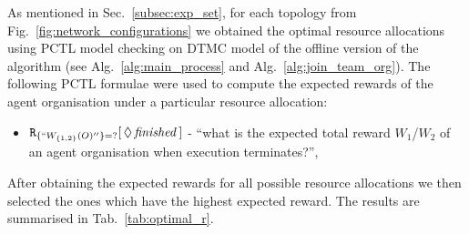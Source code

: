 \documentclass{llncs}
\begin{document}
\begin{table}
\centering
{}

\caption{Model comparison for different number of agents in a fully connected agent organisation and different models for offline version of the Alg.~\ref{alg:main_process}.}
\label{tab:model_sizes}
\end{table}

As mentioned in Sec.~\ref{subsec:exp_set}, for each topology from Fig.~\ref{fig:network_configurations} we obtained the optimal resource allocations using PCTL model checking on DTMC model of the offline version of the algorithm (see Alg.~\ref{alg:main_process} and Alg.~\ref{alg:join_team_org}). The following PCTL formulae were used to compute the expected rewards of the agent organisation under a particular resource allocation:
\begin{itemize}
 \item ${\tt R}_{\{``W_{\{1,2\}}(O)''\}=?}[\,\Diamond\,\mathit{finished}\,]$ -
``what is the expected total reward  $W_1$/$W_2$ of an agent organisation when execution terminates?'',
\end{itemize}
After obtaining the expected rewards for all possible resource allocations we then selected the ones which have the highest expected reward. The results are summarised in Tab.~\ref{tab:optimal_r}.
\end{document}
